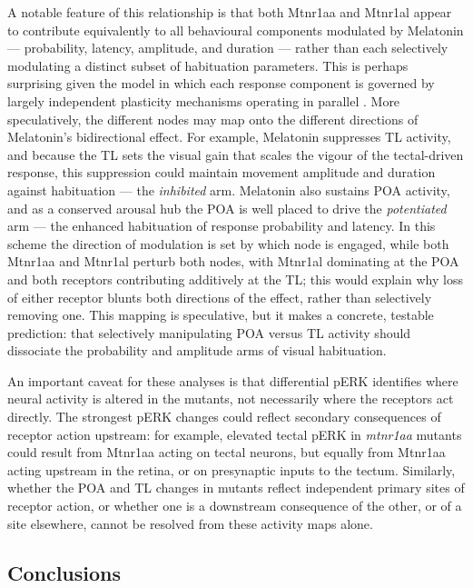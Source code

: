 \documentclass[9.5pt]{RandlettLab_elife}            %
\begin{document}
A notable feature of this relationship is that both Mtnr1aa and Mtnr1al appear to contribute equivalently to all behavioural components modulated by Melatonin — probability, latency, amplitude, and duration — rather than each selectively modulating a distinct subset of habituation parameters.
This is perhaps surprising given the model in which each response component is governed by largely independent plasticity mechanisms operating in parallel \citep{Randlett2019-fj, Nelson2022}.
More speculatively, the different nodes may map onto the different directions of Melatonin's bidirectional effect.
For example, Melatonin suppresses TL activity, and because the TL sets the visual gain that scales the vigour of the tectal-driven response, this suppression could maintain movement amplitude and duration against habituation — the \emph{inhibited} arm.
Melatonin also sustains POA activity, and as a conserved arousal hub the POA is well placed to drive the \emph{potentiated} arm — the enhanced habituation of response probability and latency.
In this scheme the direction of modulation is set by which node is engaged, while both Mtnr1aa and Mtnr1al perturb both nodes, with Mtnr1al dominating at the POA and both receptors contributing additively at the TL; this would explain why loss of either receptor blunts both directions of the effect, rather than selectively removing one.
This mapping is speculative, but it makes a concrete, testable prediction: that selectively manipulating POA versus TL activity should dissociate the probability and amplitude arms of visual habituation.

An important caveat for these analyses is that differential pERK identifies where neural activity is altered in the mutants, not necessarily where the receptors act directly.
The strongest pERK changes could reflect secondary consequences of receptor action upstream: for example, elevated tectal pERK in \emph{mtnr1aa} mutants could result from Mtnr1aa acting on tectal neurons, but equally from Mtnr1aa acting upstream in the retina, or on presynaptic inputs to the tectum.
Similarly, whether the POA and TL changes in mutants reflect independent primary sites of receptor action, or whether one is a downstream consequence of the other, or of a site elsewhere, cannot be resolved from these activity maps alone.

\subsection*{Conclusions}
\end{document}
